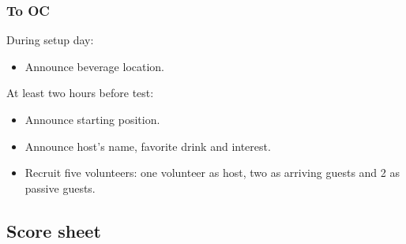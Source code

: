 \subsubsection*{To OC}


During setup day:
\begin{itemize}
	\item Announce beverage location.
\end{itemize}


At least two hours before test:
\begin{itemize}
	\item Announce starting position.
	\item Announce host's name, favorite drink and interest.
	\item Recruit five volunteers: one volunteer as host, two as arriving guests and 2 as passive guests.

\end{itemize}

\subsection*{Score sheet}
